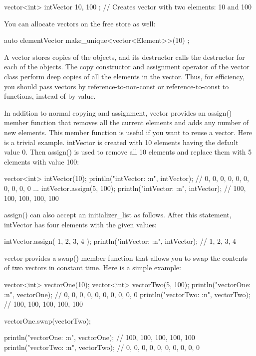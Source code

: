 \begin{cpp}
vector<int> intVector { 10, 100 }; // Creates vector with two elements: 10 and 100
\end{cpp}

You can allocate vectors on the free store as well:

\begin{cpp}
auto elementVector { make_unique<vector<Element>>(10) };
\end{cpp}


A vector stores copies of the objects, and its destructor calls the destructor for each of the objects.
The copy constructor and assignment operator of the vector class perform deep copies of all the elements in the vector. Thus, for efficiency, you should pass vectors by reference-to-non-const or reference-to-const to functions, instead of by value.

In addition to normal copying and assignment, vector provides an assign() member function that removes all the current elements and adds any number of new elements. This member function is useful if you want to reuse a vector. Here is a trivial example. intVector is created with 10 elements having the default value 0. Then assign() is used to remove all 10 elements and replace them with 5 elements with value 100:

\begin{cpp}
vector<int> intVector(10);
println("intVector: {:n}", intVector); // 0, 0, 0, 0, 0, 0, 0, 0, 0, 0
...
intVector.assign(5, 100);
println("intVector: {:n}", intVector); // 100, 100, 100, 100, 100
\end{cpp}

assign() can also accept an initializer\_list as follows. After this statement, intVector has four elements with the given values:

\begin{cpp}
intVector.assign({ 1, 2, 3, 4 });
println("intVector: {:n}", intVector); // 1, 2, 3, 4
\end{cpp}

vector provides a swap() member function that allows you to swap the contents of two vectors in constant time. Here is a simple example:

\begin{cpp}
vector<int> vectorOne(10);
vector<int> vectorTwo(5, 100);
println("vectorOne: {:n}", vectorOne); // 0, 0, 0, 0, 0, 0, 0, 0, 0, 0
println("vectorTwo: {:n}", vectorTwo); // 100, 100, 100, 100, 100

vectorOne.swap(vectorTwo);

println("vectorOne: {:n}", vectorOne); // 100, 100, 100, 100, 100
println("vectorTwo: {:n}", vectorTwo); // 0, 0, 0, 0, 0, 0, 0, 0, 0, 0
\end{cpp}

